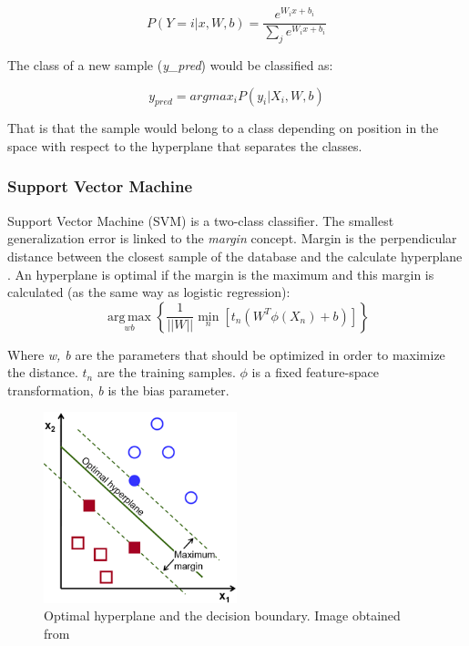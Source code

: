 \begin{equation}
P(Y=i|x,W,b) = \frac{e^{W_ix+b_i}}{\sum_j e^{W_ix+b_i}}
\end{equation}

The class of a new sample (\textit{y\_{pred}}) would be classified as:

\begin{equation}
y_{pred} = argmax_{i}P(y_i|X_i,W,b)
\end{equation}

That is that the sample would belong to a class depending on position in the space with respect to the hyperplane that separates the classes.\\

\subsubsection{Support Vector Machine}
Support Vector Machine (SVM) is a two-class classifier. The smallest generalization error is linked to the \textit{margin} concept. Margin is the perpendicular distance between the closest sample of the database and the calculate hyperplane \cite{MachineLearning}. An hyperplane is optimal if the margin is the maximum and this margin is calculated (as the same way as logistic regression):\\

\begin{equation}
\underset{w b}{\operatorname{arg\,max}}\left \{ \frac{1}{||W||} \underset{n}{\operatorname{min}}[t_{n}(W^T \phi (X_n)+b)]   \right \}
\end{equation}


Where \textit{w, b} are the parameters that should be optimized in order to maximize the distance. \textit{$t_n$} are the training samples. $\phi$ is a fixed feature-space transformation, \textit{b} is the bias parameter.\\

\begin{figure}[htb]
\centering
\includegraphics[width=0.5\textwidth]{images_miscelaneus/svm.png}
\caption{Optimal hyperplane and the decision boundary. Image obtained from \cite{SVMimage}} \label{fig:SVM}
\end{figure}

